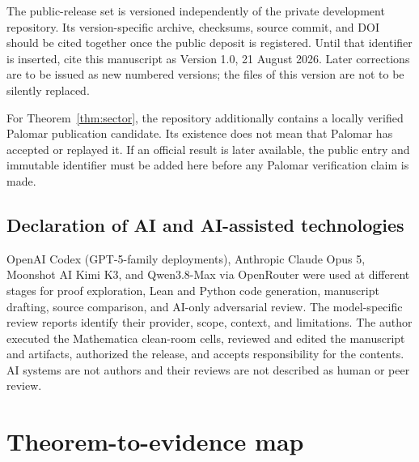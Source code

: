 \documentclass[12pt]{article}
\begin{document}
The public-release set is versioned independently of the private development
repository.  Its version-specific archive, checksums, source commit, and DOI
should be cited together once the public deposit is registered.  Until that
identifier is inserted, cite this manuscript as Version 1.0, 21 August 2026.
Later corrections are to be issued as new numbered versions; the files of
this version are not to be silently replaced.

For Theorem~\ref{thm:sector}, the repository additionally contains a locally
verified Palomar publication candidate.  Its existence does not mean that
Palomar has accepted or replayed it.  If an official result is later
available, the public entry and immutable identifier must be added here
before any Palomar verification claim is made.

\subsection*{Declaration of AI and AI-assisted technologies}
OpenAI Codex (GPT-5-family deployments), Anthropic Claude Opus 5, Moonshot
AI Kimi K3, and Qwen3.8-Max via OpenRouter were used at different stages for
proof exploration, Lean and Python code generation, manuscript drafting,
source comparison, and AI-only adversarial review.  The model-specific review
reports identify their provider, scope, context, and limitations.  The author
executed the Mathematica clean-room cells, reviewed and edited the manuscript
and artifacts, authorized the release, and accepts responsibility for the
contents.  AI systems are not authors and their reviews are not described as
human or peer review.

\appendix
\section{Theorem-to-evidence map}\label{app:map}
\end{document}
